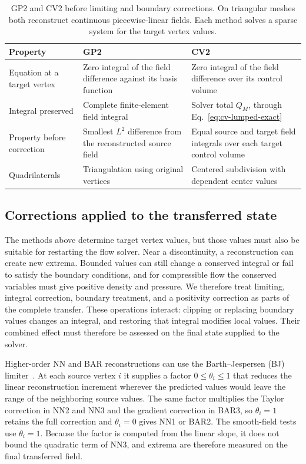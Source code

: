 \documentclass[a4paper,fleqn]{cas-sc}
\begin{document}
\begin{table}[pos=htbp]
\centering\small
\caption{GP2 and CV2 before limiting and boundary corrections. On triangular meshes both reconstruct continuous piecewise-linear fields. Each method solves a sparse system for the target vertex values.}
\label{tab:gp-cv-comparison}
\begin{tabular}{@{}p{.20\linewidth}p{.35\linewidth}p{.35\linewidth}@{}}
\toprule
Property & GP2 & CV2\\
\midrule
Equation at a target vertex &
Zero integral of the field difference against its basis function &
Zero integral of the field difference over its control volume\\
Integral preserved &
Complete finite-element field integral &
Solver total $Q_M$, through Eq.~\eqref{eq:cv-lumped-exact}\\
Property before correction &
Smallest $L^2$ difference from the reconstructed source field &
Equal source and target field integrals over each target control volume\\
Quadrilaterals &
Triangulation using original vertices &
Centered subdivision with dependent center values\\
\bottomrule
\end{tabular}
\end{table}

\FloatBarrier
\subsection{Corrections applied to the transferred state}
\label{sec:global-correction}
\label{sec:galerkin-limiter}
The methods above determine target vertex values, but those values must also be suitable for restarting the flow solver. Near a discontinuity, a reconstruction can create new extrema. Bounded values can still change a conserved integral or fail to satisfy the boundary conditions, and for compressible flow the conserved variables must give positive density and pressure. We therefore treat limiting, integral correction, boundary treatment, and a positivity correction as parts of the complete transfer. These operations interact: clipping or replacing boundary values changes an integral, and restoring that integral modifies local values. Their combined effect must therefore be assessed on the final state supplied to the solver.

Higher-order NN and BAR reconstructions can use the Barth--Jespersen (BJ) limiter~\cite{BarthJespersen1989}. At each source vertex $i$ it supplies a factor $0\leq\theta_i\leq1$ that reduces the linear reconstruction increment wherever the predicted values would leave the range of the neighboring source values. The same factor multiplies the Taylor correction in NN2 and NN3 and the gradient correction in BAR3, so $\theta_i=1$ retains the full correction and $\theta_i=0$ gives NN1 or BAR2. The smooth-field tests use $\theta_i=1$. Because the factor is computed from the linear slope, it does not bound the quadratic term of NN3, and extrema are therefore measured on the final transferred field.
\end{document}
